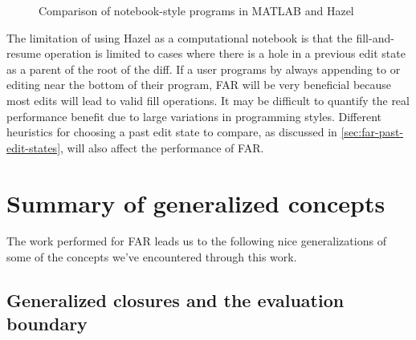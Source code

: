 \begin{figure}
  \centering
  \begin{singlespace}
  \end{singlespace}
  \caption{Comparison of notebook-style programs in MATLAB and Hazel}
  \label{fig:notebook-comparison}
\end{figure}

The limitation of using Hazel as a computational notebook is that the fill-and-resume operation is limited to cases where there is a hole in a previous edit state as a parent of the root of the diff. If a user programs by always appending to or editing near the bottom of their program, FAR will be very beneficial because most edits will lead to valid fill operations. It may be difficult to quantify the real performance benefit due to large variations in programming styles. Different heuristics for choosing a past edit state to compare, as discussed in \cref{sec:far-past-edit-states}, will also affect the performance of FAR.

\section{Summary of generalized concepts}
\label{sec:summary-generalizations}

The work performed for FAR leads us to the following nice generalizations of some of the concepts we've encountered through this work.

\subsection{Generalized closures and the evaluation boundary}
\label{sec:generalized-closures}

